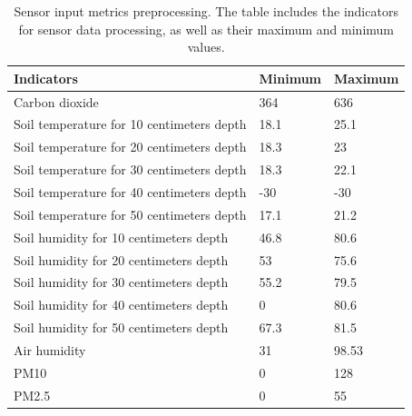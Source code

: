 \documentclass[acmsmall,manuscript, screen, review]{acmart}
\begin{document}
\begin{table}
  \caption{Sensor input metrics preprocessing. The table includes the indicators for sensor data processing, as well as their maximum and minimum values. \label{tab:sensor_input_metrics_preprocessing}}

  \begin{tabular}{lll}
    \hline
    \multicolumn{1}{l}{Indicators}            & \multicolumn{1}{l}{Minimum} & \multicolumn{1}{l}{Maximum} \\
    \hline
    Carbon dioxide                            & 364                         & 636                         \\
    Soil temperature for 10 centimeters depth & 18.1                        & 25.1                        \\
    Soil temperature for 20 centimeters depth & 18.3                        & 23                          \\
    Soil temperature for 30 centimeters depth & 18.3                        & 22.1                        \\
    Soil temperature for 40 centimeters depth & -30                         & -30                         \\
    Soil temperature for 50 centimeters depth & 17.1                        & 21.2                        \\
    Soil humidity for 10 centimeters depth    & 46.8                        & 80.6                        \\
    Soil humidity for 20 centimeters depth    & 53                          & 75.6                        \\
    Soil humidity for 30 centimeters depth    & 55.2                        & 79.5                        \\
    Soil humidity for 40 centimeters depth    & 0                           & 80.6                        \\
    Soil humidity for 50 centimeters depth    & 67.3                        & 81.5                        \\
    Air humidity                              & 31                          & 98.53                       \\
    PM10                                      & 0                           & 128                         \\
    PM2.5                                     & 0                           & 55                          \\

\end{tabular}
\end{table}
\end{document}
